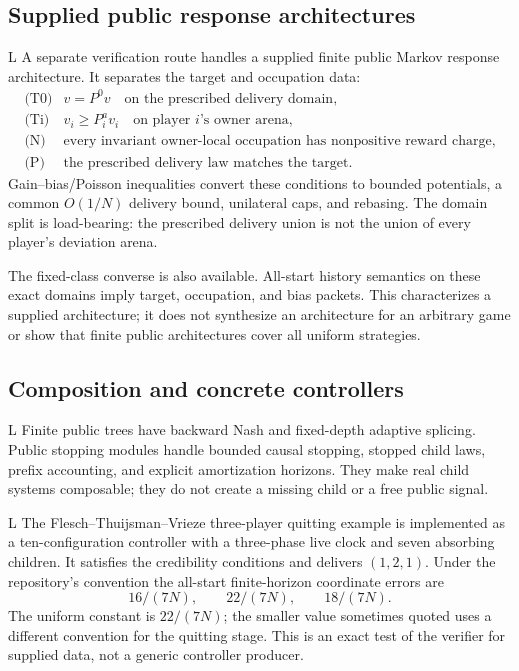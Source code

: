 \documentclass[11pt]{article}
\newcommand{\LTag}{\textsf{L}}
\newcommand{\Prod}{\LTag}
\newcommand{\Status}[1]{#1}
\begin{document}
\subsection{Supplied public response architectures}

\Status{\Prod} A separate verification route handles a supplied finite public
Markov response architecture.  It separates the target and occupation data:
\[
\begin{array}{ll}
\text{(T0)} & v=P^0v\quad\text{on the prescribed delivery domain},\\
\text{(Ti)} & v_i\geq P_i^a v_i\quad\text{on player \(i\)'s owner arena},\\
\text{(N)} & \text{every invariant owner-local occupation has nonpositive
reward charge},\\
\text{(P)} & \text{the prescribed delivery law matches the target}.
\end{array}
\tag{3}
\]
Gain--bias/Poisson inequalities convert these conditions to bounded
potentials, a common \(O(1/N)\) delivery bound, unilateral caps, and
rebasing.  The domain split is load-bearing: the prescribed delivery union is
not the union of every player's deviation arena.

The fixed-class converse is also available.  All-start history semantics on
these exact domains imply target, occupation, and bias packets.
This characterizes a supplied architecture; it does not synthesize an
architecture for an arbitrary game or show that finite public architectures
cover all uniform strategies.

\subsection{Composition and concrete controllers}

\Status{\Prod} Finite public trees have backward Nash and fixed-depth adaptive
splicing.  Public stopping modules handle bounded causal stopping, stopped
child laws, prefix accounting, and explicit amortization horizons.  They make
real child systems composable; they do not create a missing child or a free
public signal.

\Status{\Prod} The Flesch--Thuijsman--Vrieze three-player quitting example is
implemented as a ten-configuration controller with a three-phase live clock
and seven absorbing children.  It satisfies the credibility conditions and
delivers \((1,2,1)\).  Under the repository's convention the all-start
finite-horizon coordinate errors are
\[
 16/(7N),\qquad22/(7N),\qquad18/(7N).
\tag{4}
\]
The uniform constant is \(22/(7N)\); the smaller value sometimes quoted uses
a different convention for the quitting stage.  This is an exact test of the
verifier for supplied data, not a generic controller producer.
\end{document}
